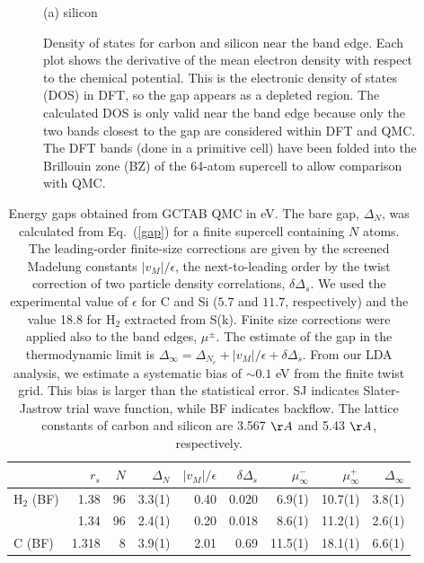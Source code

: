 \begin{figure}
\begin{minipage}{\columnwidth}
(a) silicon
\end{minipage}
\caption{Density of states for carbon and silicon near the band edge. Each plot shows the derivative of the  mean electron density with respect to the chemical potential. This is the electronic density of states (DOS) in DFT, so the gap appears as a depleted region. %
The calculated DOS is only valid near the band edge because only the two bands closest to the gap are considered within DFT and QMC. The DFT bands (done in a primitive cell) have been folded into the Brillouin zone (BZ) of the 64-atom supercell to allow comparison with QMC. \label{fig:band_edges}}
\end{figure}

\begin{table}
\caption{Energy gaps obtained from GCTAB QMC in eV. The bare gap,
$\Delta_{N}$, was calculated from Eq.~(\ref{gap})
for a finite supercell containing $N$ atoms.
The leading-order finite-size corrections are given by the
screened Madelung constants $|v_M|/\epsilon$, the next-to-leading order by the twist correction of two particle density correlations, $\delta \Delta_s$.
We used the experimental value of $\epsilon$ for C and Si ($5.7$ and $11.7$, respectively) and the value 18.8 for H$_2$ extracted from S(k).
Finite size corrections were applied also to the band edges,  $\mu^{\pm}$.
The estimate of the gap in the thermodynamic limit is
 $\Delta_\infty=\Delta_{N_e}+|v_M|/\epsilon+\delta \Delta_s$.
From our LDA analysis, we estimate a systematic bias of $\sim 0.1$ eV from the finite twist grid. This bias is larger than the statistical error. SJ indicates Slater-Jastrow trial wave function,
while BF indicates backflow. The lattice constants of carbon and silicon are 3.567 $\AA$ and 5.43 $\AA$, respectively. \label{tab:dmc-gcta-gap}}
\begin{tabular}{lrrrrrrrr}
\hline\hline
 &$r_s$& $N$ & $\Delta_{N}$ & $|v_M|/\epsilon$ & $\delta \Delta_s$ & $\mu^-_{\infty}$ & $\mu^+_{\infty}$ & $\Delta_\infty$ \\
\hline
H$_2$ (BF) & 1.38  &  96 & 3.3(1)   & 0.40 & 0.020 & 6.9(1) & 10.7(1) & 3.8(1) \\
       & 1.34  &  96 & 2.4(1)   & 0.20 & 0.018 & 8.6(1) & 11.2(1) & 2.6(1) \\
\hline
C (BF) & 1.318 &   8 & 3.9(1) & 2.01 & 0.69 & 11.5(1) & 18.1(1) & 6.6(1) \\

\end{tabular}
\end{table}
